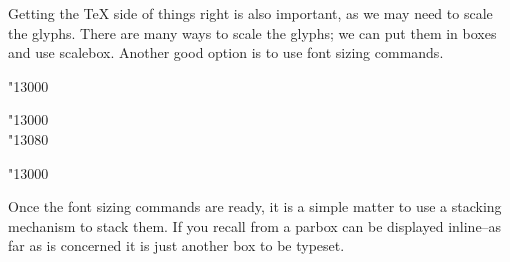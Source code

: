 Getting the TeX side of things right is also important, as we may need to scale the glyphs. There are many ways to scale the glyphs; we can put them in boxes and use scalebox. Another good option is to use font sizing commands.

\begin{center}

{\hiero\fontsize{2cm}{0.5em}\selectfont \char"13000}
{\hiero\fontsize{1cm}{0.25em}\selectfont 
\parbox[b]{1cm}{\hiero\char"13000\\ \char"13080}
}
{
\hiero\fontsize{0.66cm}{0.5em}\selectfont 
{}
\hiero\fontsize{2cm}{0.5em}\selectfont \char"13000
}



\end{center}

Once the font sizing commands are ready, it is a simple matter to use a stacking mechanism to stack them. If you recall from a parbox can be displayed inline--as far as \tex is concerned it is just another box to be typeset.  



